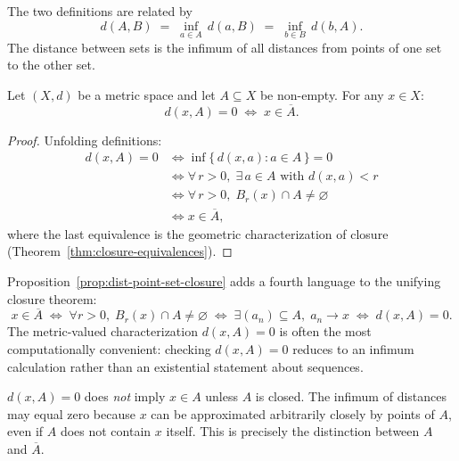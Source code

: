 \begin{remark*}
The two definitions are related by
\[
d(A, B) \;=\; \inf_{a \in A}\, d(a, B) \;=\; \inf_{b \in B}\, d(b, A).
\]
The distance between sets is the infimum of all distances from points of
one set to the other set.
\end{remark*}


\begin{proposition}
\label{prop:dist-point-set-closure}
Let $(X,d)$ be a metric space and let $A \subseteq X$ be non-empty.
For any $x \in X$:
\[
d(x, A) = 0
\;\iff\;
x \in \overline{A}.
\]
\end{proposition}

\begin{proof}
Unfolding definitions:
\begin{align*}
d(x, A) = 0
&\iff \inf\{\, d(x,a) : a \in A \,\} = 0 \\
&\iff \forall\, r > 0,\; \exists\, a \in A \text{ with } d(x,a) < r \\
&\iff \forall\, r > 0,\; B_r(x) \cap A \neq \varnothing \\
&\iff x \in \overline{A},
\end{align*}
where the last equivalence is the geometric characterization of closure
(Theorem~\ref{thm:closure-equivalences}).
\end{proof}

\begin{remark*}
Proposition~\ref{prop:dist-point-set-closure} adds a fourth language to
the unifying closure theorem:
\[
x \in \overline{A}
\;\iff\;
\forall r>0,\; B_r(x) \cap A \neq \varnothing
\;\iff\;
\exists (a_n) \subseteq A,\; a_n \to x
\;\iff\;
d(x, A) = 0.
\]
The metric-valued characterization $d(x,A) = 0$ is often the most
computationally convenient: checking $d(x,A) = 0$ reduces to an
infimum calculation rather than an existential statement about sequences.
\end{remark*}

\begin{remark*}
$d(x, A) = 0$ does \emph{not} imply $x \in A$ unless $A$ is closed.
The infimum of distances may equal zero because $x$ can be approximated
arbitrarily closely by points of $A$, even if $A$ does not contain $x$ itself.
This is precisely the distinction between $A$ and $\overline{A}$.
\end{remark*}

